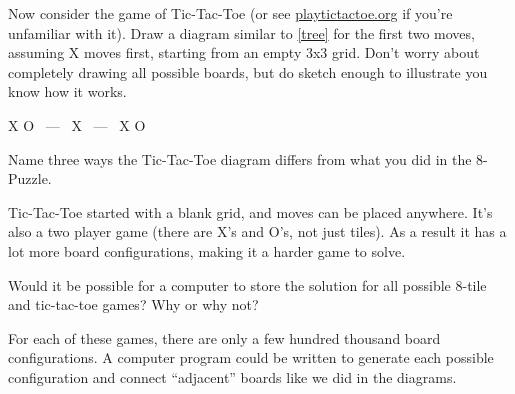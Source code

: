 \Q Now consider the game of Tic-Tac-Toe (or see \href{http://playtictactoe.org/}{playtictactoe.org} if you're unfamiliar with it).
Draw a diagram similar to \ref{tree} for the first two moves, assuming X moves first, starting from an empty 3x3 grid.
Don't worry about completely drawing all possible boards, but do sketch enough to illustrate you know how it works.

\begin{answer}[10em]
\begin{center}
\board
{X}{}{}
{}{O}{}
{}{}{}
~---~
\board
{X}{}{}
{}{}{}
{}{}{}
~---~
\board
{X}{}{}
{}{}{}
{}{}{O}
\end{center}
\end{answer}


\Q Name three ways the Tic-Tac-Toe diagram differs from what you did in the 8-Puzzle. 

\begin{answer}[5em]
Tic-Tac-Toe started with a blank grid, and moves can be placed anywhere.
It's also a two player game (there are X's and O's, not just tiles).
As a result it has a lot more board configurations, making it a harder game to solve.
\end{answer}


\Q Would it be possible for a computer to store the solution for all possible 8-tile and tic-tac-toe games? Why or why not?

\begin{answer}[5em]
For each of these games, there are only a few hundred thousand board configurations.
A computer program could be written to generate each possible configuration and connect ``adjacent'' boards like we did in the diagrams.
\end{answer}

